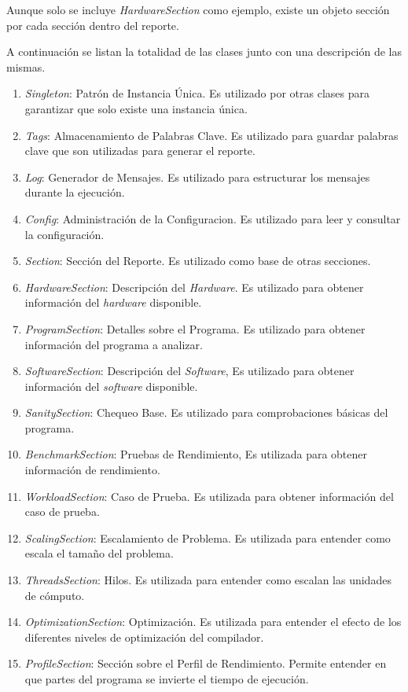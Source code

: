 \documentclass[a4paper]{report}
\begin{document}
Aunque solo se incluye {\it HardwareSection} como ejemplo, existe un objeto sección por cada sección dentro del reporte.

A continuación se listan la totalidad de las clases junto con una descripción de las mismas.

\begin{enumerate}
\item {\it Singleton}: Patrón de Instancia Única. Es utilizado por otras clases para garantizar que solo existe una instancia única.
\item {\it Tags}: Almacenamiento de Palabras Clave. Es utilizado para guardar palabras clave que son utilizadas para generar el reporte.
\item {\it Log}: Generador de Mensajes. Es utilizado para estructurar los mensajes durante la ejecución.
\item {\it Config}: Administración de la Configuracion. Es utilizado para leer y consultar la configuración.
\item {\it Section}: Sección del Reporte. Es utilizado como base de otras secciones.
\item {\it HardwareSection}: Descripción del {\it Hardware}. Es utilizado para obtener información del {\it hardware} disponible.
\item {\it ProgramSection}: Detalles sobre el Programa. Es utilizado para obtener información del programa a analizar.
\item {\it SoftwareSection}: Descripción del {\it Software}, Es utilizado para obtener información del {\it software} disponible.
\item {\it SanitySection}: Chequeo Base. Es utilizado para comprobaciones básicas del programa.
\item {\it BenchmarkSection}: Pruebas de Rendimiento, Es utilizada para obtener información de rendimiento.
\item {\it WorkloadSection}: Caso de Prueba. Es utilizada para obtener información del caso de prueba.
\item {\it ScalingSection}: Escalamiento de Problema. Es utilizada para entender como escala el tamaño del problema.
\item {\it ThreadsSection}: Hilos. Es utilizada para entender como escalan las unidades de cómputo.
\item {\it OptimizationSection}: Optimización. Es utilizada para entender el efecto de los diferentes niveles de optimización del compilador.
\item {\it ProfileSection}: Sección sobre el Perfil de Rendimiento. Permite entender en que partes del programa se invierte el tiempo de ejecución.

\end{enumerate}
\end{document}
